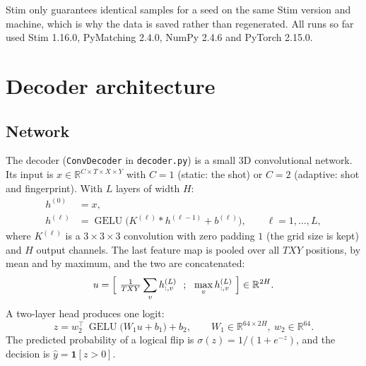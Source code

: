 \documentclass[11pt,a4paper]{article}
\newcommand{\code}[1]{\texttt{#1}}
\DeclareMathOperator{\GELU}{GELU}
\newcommand{\R}{\mathbb{R}}
\begin{document}
Stim only guarantees identical samples for a seed on the same Stim version and machine, which is why the
data is saved rather than regenerated. All runs so far used Stim 1.16.0, PyMatching 2.4.0, NumPy 2.4.6 and
PyTorch 2.15.0.

\section{Decoder architecture}\label{sec:arch}

\subsection{Network}
The decoder (\code{ConvDecoder} in \code{decoder.py}) is a small 3D convolutional network. Its input is
$x\in\R^{C\times T\times X\times Y}$ with $C=1$ (static: the shot) or $C=2$ (adaptive: shot and fingerprint).
With $L$ layers of width $H$:
\begin{align}
  h^{(0)} &= x, \\
  h^{(\ell)} &= \GELU\bigl(K^{(\ell)} * h^{(\ell-1)} + b^{(\ell)}\bigr), \qquad \ell = 1,\dots,L,
\end{align}
where $K^{(\ell)}$ is a $3\times3\times3$ convolution with zero padding $1$ (the grid size is kept) and
$H$ output channels. The last feature map is pooled over all $TXY$ positions, by mean and by maximum, and
the two are concatenated:
\begin{equation}
  u = \Bigl[\ \tfrac{1}{TXY}\sum_{v} h^{(L)}_{:,v}\ \ ;\ \ \max_{v} h^{(L)}_{:,v}\ \Bigr] \in \R^{2H}.
\end{equation}
A two-layer head produces one logit:
\begin{equation}
  z = w_2^{\top}\,\GELU\bigl(W_1 u + b_1\bigr) + b_2,\qquad W_1\in\R^{64\times 2H},\ w_2\in\R^{64}.
\end{equation}
The predicted probability of a logical flip is $\sigma(z) = 1/(1+e^{-z})$, and the decision is
$\hat y = \mathbf 1[z>0]$.
\end{document}

